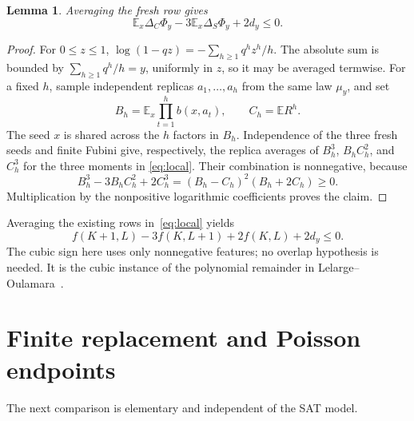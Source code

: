 \documentclass[11pt]{article}
\newtheorem{lemma}[theorem]{Lemma}
\theoremstyle{remark}
\newcommand{\E}{\mathbb{E}}
\begin{document}
\begin{lemma}\label{lem:cubic}
Averaging the fresh row gives
\begin{equation}\label{eq:local}
 \E_x\Delta_C\Phi_y-3\E_x\Delta_S\Phi_y+2d_y\leq0.
\end{equation}
\end{lemma}
\begin{proof}
For $0\leq z\leq1$,
$\log(1-qz)=-\sum_{h\geq1}q^hz^h/h$. The absolute sum is bounded by
$\sum_{h\geq1}q^h/h=y$, uniformly in $z$, so it may be averaged termwise.
For a fixed $h$, sample independent replicas $a_1,\ldots,a_h$ from the
same law $\mu_y$, and set
\[
 B_h=\E_x\prod_{t=1}^h b(x,a_t),\qquad C_h=\E R^h.
\]
The seed $x$ is shared across the $h$ factors in $B_h$. Independence of
the three fresh seeds and finite Fubini give, respectively, the replica
averages of $B_h^3$, $B_hC_h^2$, and $C_h^3$ for the three moments in
\eqref{eq:local}. Their combination is nonnegative, because
\[
 B_h^3-3B_hC_h^2+2C_h^3=(B_h-C_h)^2(B_h+2C_h)\geq0.
\]
Multiplication by the nonpositive logarithmic coefficients proves the claim.
\end{proof}

Averaging the existing rows in~\eqref{eq:local} yields
\begin{equation}\label{eq:difference}
 f(K+1,L)-3f(K,L+1)+2f(K,L)+2d_y\leq0.
\end{equation}
The cubic sign here uses only nonnegative features; no overlap hypothesis
is needed. It is the cubic instance of the polynomial remainder in
Lelarge--Oulamara~\cite[condition (4), equation (30)]{LO}.

\section{Finite replacement and Poisson endpoints}
The next comparison is elementary and independent of the SAT model.
\end{document}

